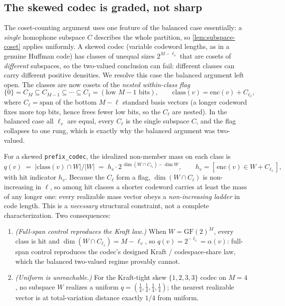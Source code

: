 \documentclass[acmsmall,review]{acmart}
\newcommand{\enc}{\mathrm{enc}}
\newcommand{\GF}{\mathrm{GF}(2)}
\newcommand{\spn}{\mathrm{span}}
\newcommand{\class}{\mathrm{class}}
\newcommand{\W}{W}                          %
\newcommand{\al}{\alpha}                    %
\newcommand{\inter}{\cap}
\begin{document}
\subsection{The skewed codec is graded, not sharp}
\label{sec:t4b}

The coset-counting argument uses one feature of the balanced case essentially: a
\emph{single} homophone subspace $C$ describes the whole partition, so
\cref{lem:subspace-coset} applies uniformly. A skewed codec (variable codeword lengths,
as in a genuine Huffman code) has classes of unequal sizes $2^{M - \ell_v}$ that are
cosets of \emph{different} subspaces, so the two-valued conclusion can fail: different
classes can carry different positive densities. We resolve this case the balanced
argument left open. The classes are now cosets of the \emph{nested within-class flag}
\[
  \{0\} = C_M \subseteq C_{M-1} \subseteq \cdots \subseteq C_1 = (\text{low } M-1 \text{ bits}),
  \qquad
  \class(v) = \enc(v) + C_{\ell_v},
\]
where $C_\ell = \spn$ of the bottom $M - \ell$ standard basis vectors (a longer codeword
fixes more top bits, hence frees fewer low bits, so the $C_\ell$ are nested). In the
balanced case all $\ell_v$ are equal, every $C_\ell$ is the single subspace $C$, and the
flag collapses to one rung, which is exactly why the balanced argument was two-valued.

\begin{theorem}
\label{thm:graded}
For a skewed \texttt{prefix\_codec}, the idealized non-member mass on each class is
\begin{equation}
  q(v) \;=\; |\class(v) \inter \W| / |\W|
       \;=\; h_v \cdot 2^{\,\dim(\W \inter C_{\ell_v}) - \dim \W},
  \qquad
  h_v = [\, \enc(v) \in \W + C_{\ell_v} \,],
  \label{eq:graded}
\end{equation}
with hit indicator $h_v$. Because the $C_\ell$ form a flag, $\dim(\W \inter C_\ell)$ is
non-increasing in $\ell$, so among hit classes a shorter codeword carries at least the
mass of any longer one: every realizable mass vector obeys a \emph{non-increasing ladder}
in code length. This is a \emph{necessary} structural constraint, not a complete
characterization. Two consequences:
\begin{enumerate}
  \item \emph{(Full-span control reproduces the Kraft law.)} When $\W = \GF^M$, every class is hit and
  $\dim(\W \inter C_{\ell_v}) = M - \ell_v$, so $q(v) = 2^{-\ell_v} = \al(v)$: full-span
  control reproduces the codec's designed Kraft / codespace-share law, which the balanced
  two-valued regime provably cannot.
  \item \emph{(Uniform is unreachable.)} For the Kraft-tight skew $\{1,2,3,3\}$ codec on
  $M = 4$, no subspace $\W$ realizes a uniform $q = (\tfrac14,\tfrac14,\tfrac14,\tfrac14)$;
  the nearest realizable vector is at total-variation distance exactly $1/4$ from uniform.
\end{enumerate}
\end{theorem}
\end{document}
